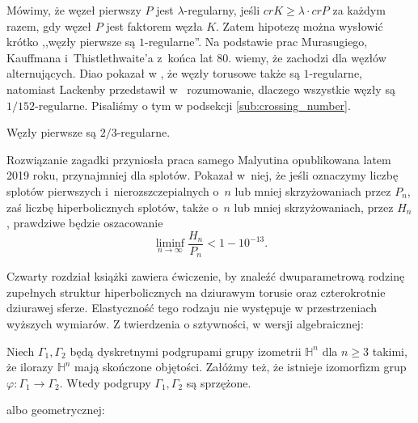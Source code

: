 Mówimy, że węzeł pierwszy $P$ jest $\lambda$-regularny, jeśli $cr K \ge \lambda \cdot cr P$ za każdym razem, gdy węzeł $P$ jest faktorem węzła $K$.
Zatem hipotezę można wysłowić krótko ,,węzły pierwsze są $1$-regularne''.
Na podstawie prac Murasugiego, Kauffmana i~Thistlethwaite'a z~końca lat 80. wiemy, że zachodzi dla węzłów alternujących.
Diao pokazał w \cite[tw. 3.8]{diao04}, że węzły torusowe także są $1$-regularne, natomiast Lackenby przedstawił w~\cite{lackenby09} rozumowanie, dlaczego wszystkie węzły są $1/152$-regularne.
Pisaliśmy o tym w podsekcji \ref{sub:crossing_number}.

\begin{conjecture}
    \label{malyutin4}
    Węzły pierwsze są $2/3$-regularne.
\end{conjecture}

Rozwiązanie zagadki przyniosła praca samego Malyutina \cite{malyutin19} opublikowana latem 2019 roku, przynajmniej dla splotów.
Pokazał w~niej, że jeśli oznaczymy liczbę splotów pierwszych i~nierozszczepialnych o~$n$ lub mniej skrzyżowaniach przez $P_n$, zaś liczbę hiperbolicznych splotów, także o~$n$ lub mniej skrzyżowaniach, przez $H_n$, prawdziwe będzie oszacowanie
\begin{equation}
    \liminf_{n \to \infty} \frac{H_n}{P_n} < 1 - 10^{-13}.
\end{equation}



Czwarty rozdział książki \cite{purcell2020} zawiera ćwiczenie, by znaleźć dwuparametrową rodzinę zupełnych struktur hiperbolicznych na dziurawym torusie oraz czterokrotnie dziurawej sferze.
Elastyczność tego rodzaju nie występuje w przestrzeniach wyższych wymiarów.
Z twierdzenia o sztywności, w wersji algebraicznej:

\begin{theorem}
    Niech $\Gamma_1, \Gamma_2$ będą dyskretnymi podgrupami grupy izometrii $\mathbb H^n$ dla $n \ge 3$ takimi, że ilorazy $\mathbb H^n$ mają skończone objętości.
    Załóżmy też, że istnieje izomorfizm grup $\varphi \colon \Gamma_1 \to \Gamma_2$.
    Wtedy podgrupy $\Gamma_1, \Gamma_2$ są sprzężone.
\end{theorem}

albo geometrycznej:

